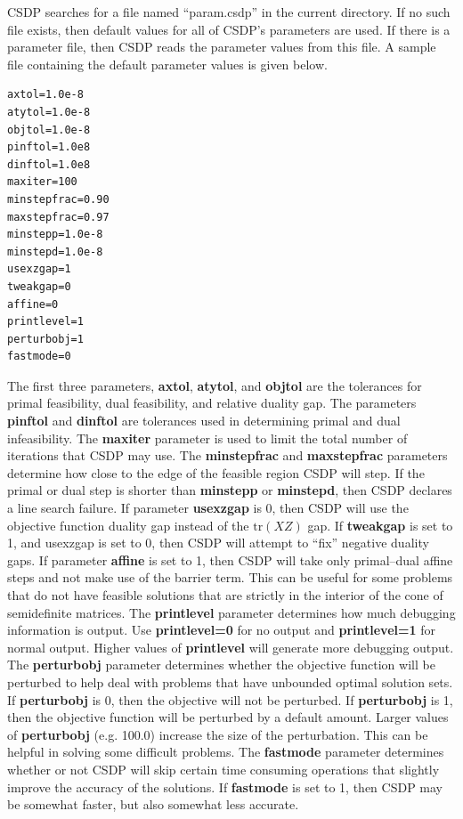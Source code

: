 \documentclass{article}
\begin{document}
CSDP searches for a file named ``param.csdp'' in the current directory.
If no such file exists, then default values for all of CSDP's parameters
are used.  If there is a parameter file, then CSDP reads the parameter
values from this file.  A sample file containing the default parameter
values is given below.  

\begin{verbatim}
axtol=1.0e-8
atytol=1.0e-8
objtol=1.0e-8
pinftol=1.0e8
dinftol=1.0e8
maxiter=100
minstepfrac=0.90
maxstepfrac=0.97
minstepp=1.0e-8
minstepd=1.0e-8
usexzgap=1
tweakgap=0
affine=0
printlevel=1
perturbobj=1
fastmode=0
\end{verbatim}

The first three parameters, {\bf axtol}, {\bf atytol}, and {\bf objtol}
are the
tolerances for primal feasibility, dual feasibility, and relative
duality gap.  The parameters {\bf pinftol} and {\bf dinftol}
are tolerances used
in determining primal and dual infeasibility.  The {\bf maxiter} parameter
is used to limit the total number of iterations that CSDP may use.
The {\bf minstepfrac} and {\bf maxstepfrac} parameters determine
how close to the
edge of the feasible region CSDP will step.  If the primal or dual
step is shorter than {\bf minstepp} or {\bf minstepd},
then CSDP declares a line
search failure.  If parameter {\bf usexzgap} is 0, then CSDP will use the
objective function duality gap instead of the   
$\mbox{tr}(XZ)$ gap.
If {\bf tweakgap} is
set to 1, and usexzgap is set to 0, then
CSDP will attempt to ``fix'' negative duality gaps.
If parameter {\bf affine} is set to 1, then CSDP will take only primal--dual
affine steps and not make use of the barrier term.  This can be useful
for some problems that do not have feasible solutions that are strictly in the
interior of the cone of semidefinite matrices.
The {\bf printlevel} parameter determines how much debugging information is
output.  Use {\bf printlevel=0} for no output and {\bf printlevel=1} for normal
output. Higher values of {\bf printlevel} will generate more debugging
output.  The {\bf perturbobj} parameter determines whether the objective
function will be perturbed to help deal with problems that have unbounded
optimal solution sets.  If {\bf perturbobj} is 0, then the objective will not
be perturbed.  If {\bf perturbobj} is 1,
then the objective function will be perturbed
by a default amount.  Larger values of {\bf perturbobj} (e.g. 100.0) increase the
size of the perturbation.  This can be helpful in solving some difficult
problems. The {\bf fastmode} parameter determines whether or not
CSDP will skip certain time consuming operations that slightly improve
the accuracy of the solutions.  If {\bf fastmode} is set to
1, then CSDP may be somewhat faster, but also somewhat less accurate.   
  
\end{document}
